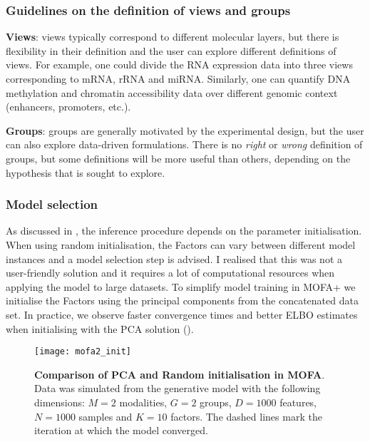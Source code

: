 \subsubsection{Guidelines on the definition of views and groups} \label{section:mofa2_guidelines_views_groups}

\textbf{Views}: views typically correspond to different molecular layers, but there is flexibility in their definition and the user can explore different definitions of views. For example, one could divide the RNA expression data into three views corresponding to mRNA, rRNA and miRNA. Similarly, one can quantify DNA methylation and chromatin accessibility data over different genomic context (enhancers, promoters, etc.).

\textbf{Groups}: groups are generally motivated by the experimental design, but the user can also explore data-driven formulations. There is no \textit{right} or \textit{wrong} definition of groups, but some definitions will be more useful than others, depending on the hypothesis that is sought to explore.

\subsubsection{Model selection} \label{section:mofa2_model_selection}

As discussed in , the inference procedure depends on the parameter initialisation. When using random initialisation, the Factors can vary between different model instances and a model selection step is advised. I realised that this was not a user-friendly solution and it requires a lot of computational resources when applying the model to large datasets. To simplify model training in MOFA+ we initialise the Factors using the principal components from the concatenated data set. In practice, we observe faster convergence times and better ELBO estimates when initialising with the PCA solution ().

\begin{figure}[H]
	\centering
	\texttt{[image: mofa2\_init]}
	\caption[]{
	\textbf{Comparison of PCA and Random initialisation in MOFA}.\\ Data was simulated from the generative model with the following dimensions: $M=2$ modalities, $G=2$ groups, $D=1000$ features, $N=1000$ samples and $K=10$ factors. The dashed lines mark the iteration at which the model converged.
	}
	\label{fig:mofa2_init}
\end{figure}

